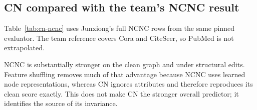 \subsection{CN compared with the team's NCNC result}
Table~\ref{tab:cn-ncnc} uses Junxiong's full NCNC rows from the same pinned evaluator. The team reference covers Cora and CiteSeer, so PubMed is not extrapolated.
\begin{table}[H]
\centering
{}%
\caption{AUROC for parameter-free CN and the team's learned NCNC model under matched data and perturbations.}
\label{tab:cn-ncnc}
\end{table}
NCNC is substantially stronger on the clean graph and under structural edits. Feature shuffling removes much of that advantage because NCNC uses learned node representations, whereas CN ignores attributes and therefore reproduces its clean score exactly. This does not make CN the stronger overall predictor; it identifies the source of its invariance.
